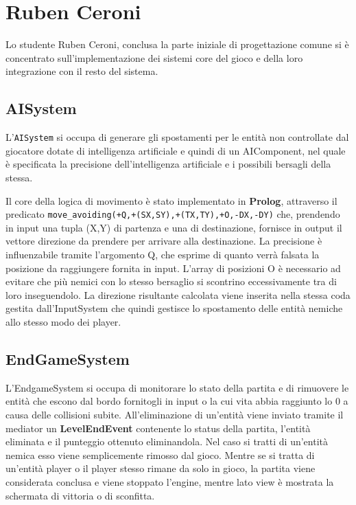 \section{Ruben Ceroni}


Lo studente Ruben Ceroni, conclusa la parte iniziale di progettazione comune si è concentrato sull'implementazione dei sistemi core del gioco e della loro integrazione con il resto del sistema.

\subsection{AISystem}
L'\texttt{AISystem} si occupa di generare gli spostamenti per le entità non controllate dal giocatore dotate di intelligenza artificiale e quindi di un AIComponent, nel quale è specificata la precisione dell'intelligenza artificiale e i possibili bersagli della stessa.

Il core della logica di movimento è stato implementato in \textbf{Prolog}, attraverso il predicato \texttt{move\_avoiding(+Q,+(SX,SY),+(TX,TY),+O,-DX,-DY)} che, prendendo in input una tupla (X,Y) di partenza e una di destinazione, fornisce in output il vettore direzione da prendere per arrivare alla destinazione.
La precisione è influenzabile tramite l'argomento Q, che esprime di quanto verrà falsata la posizione da raggiungere fornita in input.
L'array di posizioni O è necessario ad evitare che più nemici con lo stesso bersaglio si scontrino eccessivamente tra di loro inseguendolo.
La direzione risultante calcolata viene inserita nella stessa coda gestita dall'InputSystem che quindi gestisce lo spostamento delle entità nemiche allo stesso modo dei player.

\subsection{EndGameSystem}
L'EndgameSystem si occupa di monitorare lo stato della partita e di rimuovere le entità che escono dal bordo fornitogli in input o la cui vita abbia raggiunto lo 0 a causa delle collisioni subite.
All'eliminazione di un'entità  viene inviato tramite il mediator un \textbf{LevelEndEvent} contenente lo status della partita, l'entità eliminata e il punteggio ottenuto eliminandola.
Nel caso si tratti di un'entità nemica esso viene semplicemente rimosso dal gioco.
Mentre se si tratta di un'entità player o il player stesso rimane da solo in gioco, la partita viene considerata conclusa e viene stoppato l'engine, mentre lato view è mostrata la schermata di vittoria o di sconfitta. 
 
